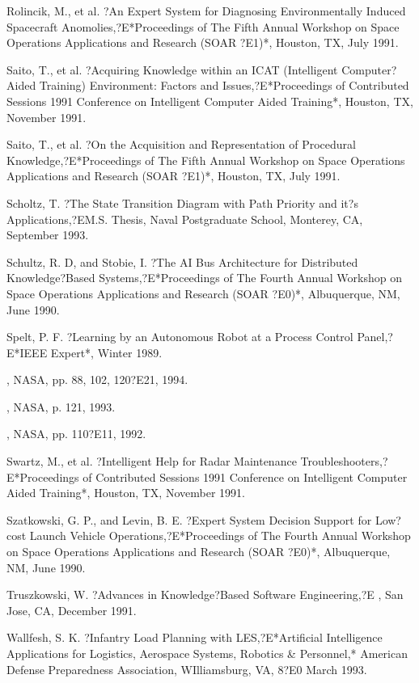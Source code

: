 \documentclass[letterpaper,10pt,english]{sphinxmanual}
\begin{document}
Rolincik, M., et al. ?An Expert System for Diagnosing Environmentally
Induced Spacecraft Anomolies,?E*Proceedings of The Fifth Annual Workshop
on Space Operations Applications and Research (SOAR ?E1)*, Houston, TX,
July 1991.

Saito, T., et al. ?Acquiring Knowledge within an ICAT (Intelligent
Computer?Aided Training) Environment: Factors and Issues,?E*Proceedings
of Contributed Sessions 1991 Conference on Intelligent Computer Aided
Training*, Houston, TX, November 1991.

Saito, T., et al. ?On the Acquisition and Representation of Procedural
Knowledge,?E*Proceedings of The Fifth Annual Workshop on Space
Operations Applications and Research (SOAR ?E1)*, Houston, TX, July
1991.

Scholtz, T. ?The State Transition Diagram with Path Priority and it?s
Applications,?EM.S. Thesis, Naval Postgraduate School, Monterey, CA,
September 1993.

Schultz, R. D, and Stobie, I. ?The AI Bus Architecture for Distributed
Knowledge?Based Systems,?E*Proceedings of The Fourth Annual Workshop on
Space Operations Applications and Research (SOAR ?E0)*, Albuquerque, NM,
June 1990.

Spelt, P. F. ?Learning by an Autonomous Robot at a Process Control
Panel,?E*IEEE Expert*, Winter 1989.

, NASA, pp. 88, 102, 120?E21, 1994.

, NASA, p. 121, 1993.

, NASA, pp. 110?E11, 1992.

Swartz, M., et al. ?Intelligent Help for Radar Maintenance
Troubleshooters,?E*Proceedings of Contributed Sessions 1991 Conference
on Intelligent Computer Aided Training*, Houston, TX, November 1991.

Szatkowski, G. P., and Levin, B. E. ?Expert System Decision Support for
Low?cost Launch Vehicle Operations,?E*Proceedings of The Fourth Annual
Workshop on Space Operations Applications and Research (SOAR ?E0)*,
Albuquerque, NM, June 1990.

Truszkowski, W. ?Advances in Knowledge?Based Software Engineering,?E
, San Jose, CA, December
1991.

Wallfesh, S. K. ?Infantry Load Planning with LES,?E*Artificial
Intelligence Applications for Logistics, Aerospace Systems, Robotics \&
Personnel,* American Defense Preparedness Association, WIlliamsburg, VA,
8?E0 March 1993.
\end{document}
